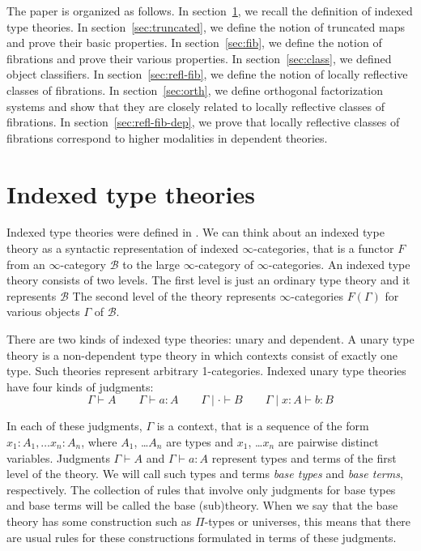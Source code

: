 \documentclass[reqno]{mscs}
\newcommand{\type}{}
\newcommand{\ob}{}
\numberwithin{figure}{section}
\begin{document}
The paper is organized as follows.
In section~\ref{sec:indexed-tt}, we recall the definition of indexed type theories.
In section~\ref{sec:truncated}, we define the notion of truncated maps and prove their basic properties.
In section~\ref{sec:fib}, we define the notion of fibrations and prove their various properties.
In section~\ref{sec:class}, we defined object classifiers.
In section~\ref{sec:refl-fib}, we define the notion of locally reflective classes of fibrations.
In section~\ref{sec:orth}, we define orthogonal factorization systems and show that they are closely related to locally reflective classes of fibrations.
In section~\ref{sec:refl-fib-dep}, we prove that locally reflective classes of fibrations correspond to higher modalities in dependent theories.

\section{Indexed type theories}
\label{sec:indexed-tt}

Indexed type theories were defined in \cite{indexed-tt}.
We can think about an indexed type theory as a syntactic representation of indexed $\infty$-categories, that is a functor $F$ from an $\infty$-category $\mathcal{B}$ to the large $\infty$-category of $\infty$-categories.
An indexed type theory consists of two levels.
The first level is just an ordinary type theory and it represents $\mathcal{B}$
The second level of the theory represents $\infty$-categories $F(\Gamma)$ for various objects $\Gamma$ of $\mathcal{B}$.

There are two kinds of indexed type theories: unary and dependent.
A unary type theory is a non-dependent type theory in which contexts consist of exactly one type.
Such theories represent arbitrary 1-categories.
Indexed unary type theories have four kinds of judgments:
\[ \Gamma \vdash A \type \qquad \Gamma \vdash a : A \qquad \Gamma \mid \cdot \vdash B \ob \qquad \Gamma \mid x : A \vdash b : B \]

In each of these judgments, $\Gamma$ is a context, that is a sequence of the form $x_1 : A_1, \ldots x_n : A_n$, where $A_1$, \ldots $A_n$ are types and $x_1$, \ldots $x_n$ are pairwise distinct variables.
Judgments $\Gamma \vdash A \type$ and $\Gamma \vdash a : A$ represent types and terms of the first level of the theory.
We will call such types and terms \emph{base types} and \emph{base terms}, respectively.
The collection of rules that involve only judgments for base types and base terms will be called the base (sub)theory.
When we say that the base theory has some construction such as $\Pi$-types or universes, this means that there are usual rules for these constructions formulated in terms of these judgments.
\end{document}
